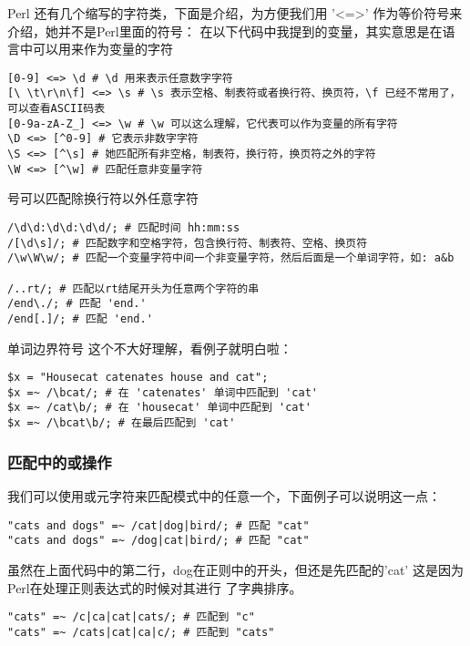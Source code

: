 \documentclass{article}
\begin{document}
Perl 还有几个缩写的字符类，下面是介绍，为方便我们用 '<=>' 作为等价符号来介绍，她并不是Perl里面的符号：
在以下代码中我提到的变量，其实意思是在语言中可以用来作为变量的字符

\begin{verbatim}
[0-9] <=> \d # \d 用来表示任意数字字符
[\ \t\r\n\f] <=> \s # \s 表示空格、制表符或者换行符、换页符，\f 已经不常用了，可以查看ASCII码表
[0-9a-zA-Z_] <=> \w # \w 可以这么理解，它代表可以作为变量的所有字符
\D <=> [^0-9] # 它表示非数字字符
\S <=> [^\s] # 她匹配所有非空格，制表符，换行符，换页符之外的字符
\W <=> [^\w] # 匹配任意非变量字符
\end{verbatim}

 号可以匹配除换行符以外任意字符

\begin{verbatim}
/\d\d:\d\d:\d\d/; # 匹配时间 hh:mm:ss
/[\d\s]/; # 匹配数字和空格字符，包含换行符、制表符、空格、换页符
/\w\W\w/; # 匹配一个变量字符中间一个非变量字符，然后后面是一个单词字符，如: a&b

/..rt/; # 匹配以rt结尾开头为任意两个字符的串
/end\./; # 匹配 'end.'
/end[.]/; # 匹配 'end.'
\end{verbatim}

单词边界符号 \code{\\b} 这个不大好理解，看例子就明白啦：

\begin{verbatim}
$x = "Housecat catenates house and cat";
$x =~ /\bcat/; # 在 'catenates' 单词中匹配到 'cat'
$x =~ /cat\b/; # 在 'housecat' 单词中匹配到 'cat'
$x =~ /\bcat\b/; # 在最后匹配到 'cat'
\end{verbatim}

\subsubsection{匹配中的或操作}
我们可以使用或元字符来匹配模式中的任意一个，下面例子可以说明这一点：

\begin{verbatim}
"cats and dogs" =~ /cat|dog|bird/; # 匹配 "cat"
"cats and dogs" =~ /dog|cat|bird/; # 匹配 "cat"
\end{verbatim}

虽然在上面代码中的第二行，dog在正则中的开头，但还是先匹配的'cat' 这是因为 Perl在处理正则表达式的时候对其进行
了字典排序。

\begin{verbatim}
"cats" =~ /c|ca|cat|cats/; # 匹配到 "c"
"cats" =~ /cats|cat|ca|c/; # 匹配到 "cats"
\end{verbatim}
\end{document}
